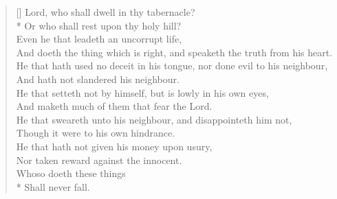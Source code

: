 \documentclass[MAIN]{subfiles}
\begin{document}
\settowidth{\versewidth}{Lord, who shall dwell in thy tabernacle?}
\begin{verse}[\versewidth]
Lord, who shall dwell in thy tabernacle?\\*
\vin Or who shall rest upon thy holy hill?\\
Even he that leadeth an uncorrupt life,\\
\vin And doeth the thing which is right, and speaketh the truth from his heart.\\
He that hath used no deceit in his tongue, nor done evil to his neighbour,\\
\vin And hath not slandered his neighbour.\\
He that setteth not by himself, but is lowly in his own eyes,\\
\vin And maketh much of them that fear the Lord.\\
He that sweareth unto his neighbour, and disappointeth him not,\\
\vin Though it were to his own hindrance.\\
He that hath not given his money upon usury,\\
\vin Nor taken reward against the innocent.\\
Whoso doeth these things\\*
\vin Shall never fall.
\end{verse}
\end{document}
